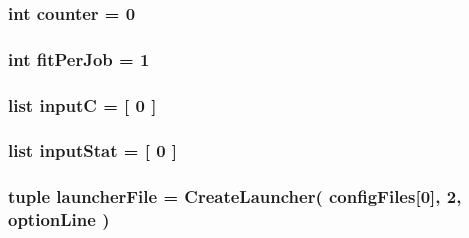 \hypertarget{namespaceGenerateToyTemplates_a617a47c70795bcff659815ad0efd2266}{
\subsubsection[{counter}]{\setlength{\rightskip}{0pt plus 5cm}int counter = 0}}\label{namespaceGenerateToyTemplates_a617a47c70795bcff659815ad0efd2266}
\hypertarget{namespaceGenerateToyTemplates_a4f12240caa1a7a0e6db36cd4409800c3}{
\subsubsection[{fit\+Per\+Job}]{\setlength{\rightskip}{0pt plus 5cm}int fit\+Per\+Job = 1}}\label{namespaceGenerateToyTemplates_a4f12240caa1a7a0e6db36cd4409800c3}
\hypertarget{namespaceGenerateToyTemplates_a4e6f79944208b4ca7650cf6c7a06aaa0}{
\subsubsection[{input\+C}]{\setlength{\rightskip}{0pt plus 5cm}list input\+C = \mbox{[} 0 \mbox{]}}}\label{namespaceGenerateToyTemplates_a4e6f79944208b4ca7650cf6c7a06aaa0}
\hypertarget{namespaceGenerateToyTemplates_a936c20454446cea1ccf4674fc1250799}{
\subsubsection[{input\+Stat}]{\setlength{\rightskip}{0pt plus 5cm}list input\+Stat = \mbox{[} 0 \mbox{]}}}\label{namespaceGenerateToyTemplates_a936c20454446cea1ccf4674fc1250799}
\hypertarget{namespaceGenerateToyTemplates_a5b48729fda45e30d48c8484a3ad43fd4}{
\subsubsection[{launcher\+File}]{\setlength{\rightskip}{0pt plus 5cm}tuple launcher\+File = Create\+Launcher( {\bf config\+Files}\mbox{[}0\mbox{]}, 2, {\bf option\+Line} )}}\label{namespaceGenerateToyTemplates_a5b48729fda45e30d48c8484a3ad43fd4}

